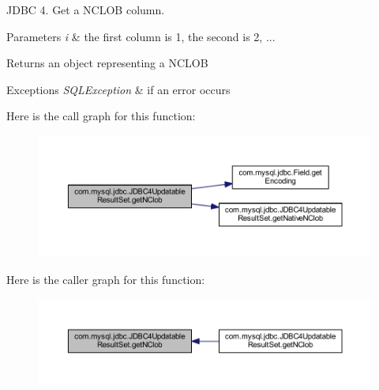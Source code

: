 J\+D\+BC 4. Get a N\+C\+L\+OB column.


\begin{DoxyParams}{Parameters}
{\em i} & the first column is 1, the second is 2, ...\\
\hline
\end{DoxyParams}
\begin{DoxyReturn}{Returns}
an object representing a N\+C\+L\+OB
\end{DoxyReturn}

\begin{DoxyExceptions}{Exceptions}
{\em S\+Q\+L\+Exception} & if an error occurs \\
\hline
\end{DoxyExceptions}
Here is the call graph for this function\+:
\nopagebreak
\begin{figure}[H]
\begin{center}
\leavevmode
\includegraphics[width=350pt]{classcom_1_1mysql_1_1jdbc_1_1_j_d_b_c4_updatable_result_set_aba4ddb87766599f6de1219a1bf1e1413_cgraph}
\end{center}
\end{figure}
Here is the caller graph for this function\+:
\nopagebreak
\begin{figure}[H]
\begin{center}
\leavevmode
\includegraphics[width=350pt]{classcom_1_1mysql_1_1jdbc_1_1_j_d_b_c4_updatable_result_set_aba4ddb87766599f6de1219a1bf1e1413_icgraph}
\end{center}
\end{figure}
\mbox{\label{classcom_1_1mysql_1_1jdbc_1_1_j_d_b_c4_updatable_result_set_abb2658c291ff8cee90f88b5767bace90}} 
